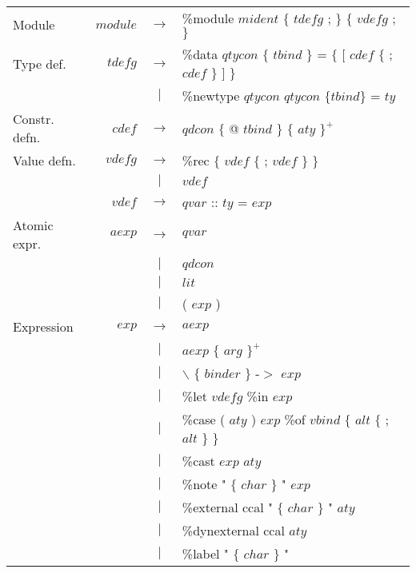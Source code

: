 \documentclass{article}
\begin{document}
\begin{small}
\begin{longtable}{ l r c l }
\centering

Module 		&
$module$	& $ \rightarrow $ 	& \%module $mident$ $\{$ $tdefg$ ; $\}$ $\{$ $vdefg$ ; $\}$				\\

Type def.&
$tdefg$ 	& $ \rightarrow $	& \%data $qtycon$ $\{$ $tbind$ $\}$  = $\{$ $[$ $cdef$ $\{$ ; $cdef$ $\}$ $]$ $\}$	\\
		&
		& $ | $			& \%newtype $qtycon$ $qtycon$ $\{ tbind \}$ = $ty$					\\

Constr. defn. 	&
$cdef$		& $ \rightarrow $	& $qdcon$ $\{$ @ $tbind$ $\}$ $\{$ $aty$ $\}^{+}$ 					\\

Value defn.	&
$vdefg$		& $ \rightarrow $	& \%rec $\{$ $vdef$ $\{$ ; $vdef$ $\}$ $\}$						\\
		&
		& $ | $			& $vdef$										\\
		&
$vdef$ 		& $ \rightarrow $	& $qvar$ :: $ty$ = $exp$								\\

Atomic expr.	&
$aexp$		& $ \rightarrow $	& $qvar$										\\
		&
		& $ | $			& $qdcon$										\\
		&
		& $ | $			& $lit$											\\
		&
		& $ | $			& ( $exp$ ) 										\\

Expression	& 
$exp$		& $ \rightarrow $	& $aexp$										\\
		&
		& $ | $			& $aexp$ $\{$ $arg$ $\}^{+}$ 								\\
		&
		& $ | $			& $\backslash$ $\{$ $binder$ $\}$ -$>$ $exp$						\\
		&
		& $ | $			& \%let	$vdefg$ \%in $exp$								\\
		&
		& $ | $			& \%case ( $aty$ ) $exp$ \%of $vbind$ $\{$ $alt$ $\{$ ; $alt$ $\}$ $\}$			\\
		&
		& $ | $			& \%cast $exp$ $aty$									\\
		&
		& $ | $			& \%note "  $\{$ $char$ $\}$ " $exp$							\\
		&
		& $ | $			& \%external ccal " $\{$ $char$ $\}$ " $aty$						\\
		&
		& $ | $			& \%dynexternal ccal $aty$								\\
		&
		& $ | $			& \%label " $\{$ $char$ $\}$ "								\\


\end{longtable}
\end{small}
\end{document}
